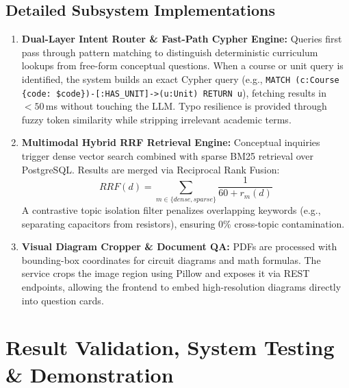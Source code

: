 \documentclass[11pt, a4paper]{article}
\begin{document}
\subsection{Detailed Subsystem Implementations}
\begin{enumerate}[noitemsep, topsep=2pt]
    \item \textbf{Dual-Layer Intent Router \& Fast-Path Cypher Engine:} Queries first pass through pattern matching to distinguish deterministic curriculum lookups from free-form conceptual questions. When a course or unit query is identified, the system builds an exact Cypher query (e.g., \texttt{MATCH (c:Course \{code: \$code\})-[:HAS\_UNIT]->(u:Unit) RETURN u}), fetching results in $<50$\,ms without touching the LLM. Typo resilience is provided through fuzzy token similarity while stripping irrelevant academic terms.
    \item \textbf{Multimodal Hybrid RRF Retrieval Engine:} Conceptual inquiries trigger dense vector search combined with sparse BM25 retrieval over PostgreSQL. Results are merged via Reciprocal Rank Fusion:
    \[ RRF(d) = \sum_{m \in \{dense, sparse\}} \frac{1}{60 + r_m(d)} \]
    A contrastive topic isolation filter penalizes overlapping keywords (e.g., separating capacitors from resistors), ensuring 0\% cross-topic contamination.
    \item \textbf{Visual Diagram Cropper \& Document QA:} PDFs are processed with bounding-box coordinates for circuit diagrams and math formulas. The service crops the image region using Pillow and exposes it via REST endpoints, allowing the frontend to embed high-resolution diagrams directly into question cards.
\end{enumerate}

\section{Result Validation, System Testing \& Demonstration}
\end{document}
